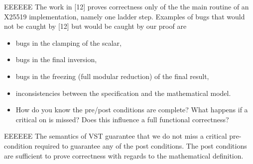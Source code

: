 \begin{answer}{EEEEEE}
    The work in [12] proves correctness only of the the main routine of an X25519
    implementation, namely one ladder step. Examples of bugs that would not be
    caught by [12] but would be caught by our proof are
    \begin{itemize}
        \item bugs in the clamping of the scalar,
        \item bugs in the final inversion,
        \item bugs in the freezing (full modular reduction) of the final result,
        \item inconsistencies between the specification and the mathematical model.
    \end{itemize}
\end{answer}

\begin{center}
\end{center}

\begin{itemize}
    \item How do you know the pre/post conditions are complete? What happens if a critical on is missed? Does this influence a full functional correctness?
\end{itemize}

\begin{answer}{EEEEEE}
    The semantics of VST guarantee that we do not miss a critical pre-condition
    required to guarantee any of the post conditions. The post conditions are
    sufficient to prove correctness with regards to the mathematical definition.
\end{answer}